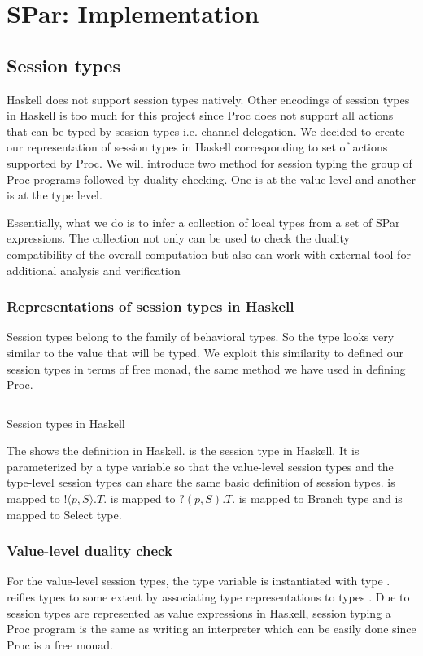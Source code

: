 \chapter{SPar: Implementation} \label{chap:impl}
\section{Session types} \label{impl:sec:session}
Haskell does not support session types natively. Other encodings of session types in Haskell is too much for this project since Proc does not support all actions that can be typed by session types i.e. channel delegation. We decided to create our representation of session types in Haskell corresponding to set of actions supported by Proc. We will introduce two method for session typing the group of Proc programs followed by duality checking. One is at the value level and another is at the type level.

Essentially, what we do is to infer a collection of local types from a set of SPar expressions. The collection not only can be used to check the duality compatibility of the overall computation but also can work with external tool \cite{langeVerifyingAsynchronousInteractions2019} for additional analysis and verification
\subsection{Representations of session types in Haskell}
Session types belong to the family of behavioral types. So the type looks very similar to the value that will be typed. We exploit this similarity to defined our session types in terms of free monad, the same method we have used in defining Proc.

\begin{listing}[ht]
    \inputminted{Haskell}{impl/type.hs}
    \caption{Session types in Haskell}
    \label{impl:code:type}
\end{listing}

The  shows the definition in Haskell.  is the session type in Haskell. It is parameterized by a type variable  so that the value-level session types and the type-level session types can share the same basic definition of session types.  is mapped to $! \langle p, S \rangle . T$.  is mapped to $?(p, S).T$.  is mapped to Branch type and  is mapped to Select type.
\subsection{Value-level duality check}
For the value-level session types, the type variable  is instantiated with type .  reifies types to some extent by associating type representations to types \cite{DataTypeable}. Due to session types are represented as value expressions in Haskell, session typing a Proc program is the same as writing an interpreter which can be easily done since Proc is a free monad. 

